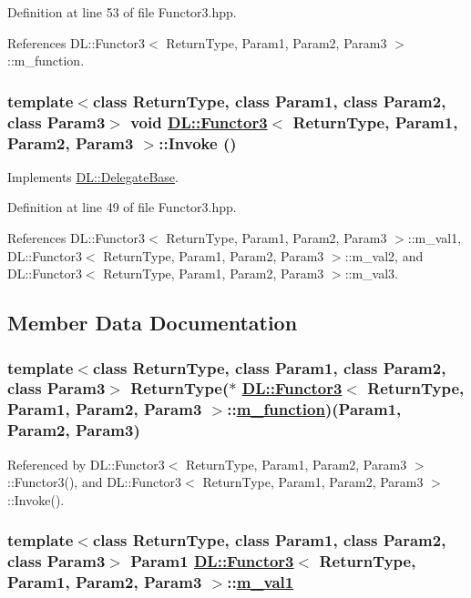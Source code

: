Definition at line 53 of file Functor3.hpp.

References DL::Functor3$<$ Return\-Type, Param1, Param2, Param3 $>$::m\_\-function.\hypertarget{classDL_1_1Functor3_a2}{
\subsubsection[Invoke]{\setlength{\rightskip}{0pt plus 5cm}template$<$class Return\-Type, class Param1, class Param2, class Param3$>$ void \hyperlink{classDL_1_1Functor3}{DL::Functor3}$<$ Return\-Type, Param1, Param2, Param3 $>$::Invoke ()}}
\label{classDL_1_1Functor3_a2}




Implements \hyperlink{classDL_1_1DelegateBase_a2}{DL::Delegate\-Base}.

Definition at line 49 of file Functor3.hpp.

References DL::Functor3$<$ Return\-Type, Param1, Param2, Param3 $>$::m\_\-val1, DL::Functor3$<$ Return\-Type, Param1, Param2, Param3 $>$::m\_\-val2, and DL::Functor3$<$ Return\-Type, Param1, Param2, Param3 $>$::m\_\-val3.

\subsection{Member Data Documentation}
\hypertarget{classDL_1_1Functor3_r0}{
\subsubsection[m\_\-function]{\setlength{\rightskip}{0pt plus 5cm}template$<$class Return\-Type, class Param1, class Param2, class Param3$>$ Return\-Type($\ast$ \hyperlink{classDL_1_1Functor3}{DL::Functor3}$<$ Return\-Type, Param1, Param2, Param3 $>$::\hyperlink{classDL_1_1Functor3_r0}{m\_\-function})(Param1, Param2, Param3)}}
\label{classDL_1_1Functor3_r0}




Referenced by DL::Functor3$<$ Return\-Type, Param1, Param2, Param3 $>$::Functor3(), and DL::Functor3$<$ Return\-Type, Param1, Param2, Param3 $>$::Invoke().\hypertarget{classDL_1_1Functor3_r1}{
\subsubsection[m\_\-val1]{\setlength{\rightskip}{0pt plus 5cm}template$<$class Return\-Type, class Param1, class Param2, class Param3$>$ Param1 \hyperlink{classDL_1_1Functor3}{DL::Functor3}$<$ Return\-Type, Param1, Param2, Param3 $>$::\hyperlink{classDL_1_1Functor3_r1}{m\_\-val1}}}
\label{classDL_1_1Functor3_r1}




